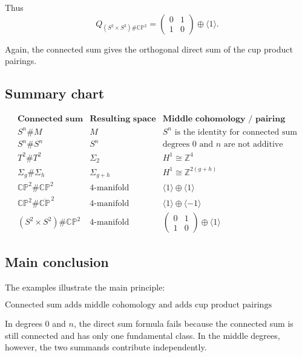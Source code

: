 \documentclass[12pt,a4paper]{article}
\theoremstyle{notespace}
\begin{document}
Thus
\[
\boxed{
	Q_{(S^2\times S^2)\#\mathbb{CP}^2}
	=
	\begin{pmatrix}
		0 & 1\\
		1 & 0
	\end{pmatrix}
	\oplus
	\langle 1\rangle.
}
\]

Again, the connected sum gives the orthogonal direct sum of the cup product
pairings.

\subsection{Summary chart}

\[
\renewcommand{\arraystretch}{1.35}
\begin{array}{c|c|c}
	\textbf{Connected sum} & \textbf{Resulting space} & \textbf{Middle cohomology / pairing} \\
	\hline
	S^n\#M
	&
	M
	&
	\text{\(S^n\) is the identity for connected sum}
	\\
	S^n\#S^n
	&
	S^n
	&
	\text{degrees \(0\) and \(n\) are not additive}
	\\
	T^2\#T^2
	&
	\Sigma_2
	&
	H^1\cong \mathbb{Z}^4
	\\
	\Sigma_g\#\Sigma_h
	&
	\Sigma_{g+h}
	&
	H^1\cong \mathbb{Z}^{2(g+h)}
	\\
	\mathbb{CP}^2\#\mathbb{CP}^2
	&
	4\text{-manifold}
	&
	\langle 1\rangle\oplus\langle 1\rangle
	\\
	\mathbb{CP}^2\#\overline{\mathbb{CP}}^{\,2}
	&
	4\text{-manifold}
	&
	\langle 1\rangle\oplus\langle -1\rangle
	\\
	(S^2\times S^2)\#\mathbb{CP}^2
	&
	4\text{-manifold}
	&
	\begin{pmatrix}
		0&1\\
		1&0
	\end{pmatrix}
	\oplus
	\langle 1\rangle
\end{array}
\]

\subsection{Main conclusion}

The examples illustrate the main principle:

\[
\boxed{
	\text{Connected sum adds middle cohomology and adds cup product pairings blockwise.}
}
\]

In degrees \(0\) and \(n\), the direct sum formula fails because the connected
sum is still connected and has only one fundamental class. In the middle
degrees, however, the two summands contribute independently.	
\end{document}
